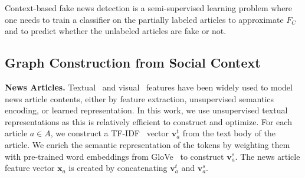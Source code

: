 \documentclass[sigconf,anonymous]{acmart}
\theoremstyle{definition}
\theoremstyle{hypothesis}
\newtheorem{hypothesis}{Hypothesis}[section]
\begin{document}
Context-based fake news detection is a semi-supervised learning problem where one needs to train a classifier on the partially labeled articles to approximate $F_C$ and to predict whether the unlabeled articles are fake or not.

\subsection{Graph Construction from Social Context}
\label{sec:graph_construction}

\textbf{News Articles.} Textual~\cite{castillo2011information,yang2012automatic,shu2019beyond,popat2018credeye} and visual~\cite{wang2018eann,khattar2019mvae} features have been widely used to model news article contents, either by feature extraction, unsupervised semantics encoding, or learned representation. In this work, we use unsupervised textual representations as this is relatively efficient to construct and optimize.
For each article $a\in A$, we construct a 
TF-IDF~\cite{Salton83} vector 
$\boldsymbol{v}^t_a$ from the text body of the article. We enrich the semantic representation of the tokens by weighting them with pre-trained word embeddings from GloVe~\cite{pennington2014glove} to construct $\boldsymbol{v}^s_a$. 
The news article feature vector $\boldsymbol{x}_a$ is created by concatenating $\boldsymbol{v}^t_a$ and $\boldsymbol{v}^s_a$.
\end{document}
